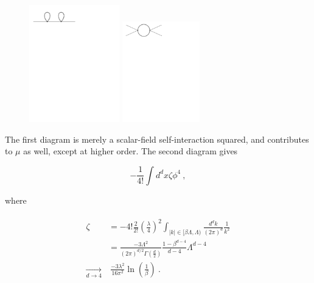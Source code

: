 \documentclass[10pt,twoside]{report}
\begin{document}
	\begin{figure}[h]
		\centering
		\includegraphics[trim={0.5cm 22cm 10cm 0cm},width=0.35\textwidth]{Figures/renorm3.pdf}
		\includegraphics[trim={0.5cm 22cm 10cm 0cm},width=0.3\textwidth]{Figures/renorm2.pdf}
		\vspace{-0.25cm}
		\label{fey:3}
	\end{figure}
	
	The first diagram is merely a scalar-field self-interaction squared, and contributes to $\mu$ as well, except at higher order. The second diagram gives
	
	\begin{equation}
		-\frac{1}{4!}\int d^dx\zeta\phi^4 \:,
	\end{equation}
	
	\noindent where
	
	\begin{align}
		\begin{split}
		\zeta &= -4! \frac{2}{2!}\left(\frac{\lambda}{4}\right)^2\int_{|k|\in[\beta\Lambda,\Lambda)}\frac{d^dk}{(2\pi)^d}\frac{1}{k^2} \\
		&= \frac{-3\Lambda^2}{(2\pi)^{d/2}\Gamma\left(\frac{d}{2}\right)}\frac{1-\beta^{d-4}}{d-4}\Lambda^{d-4}\\
		\underset{d\rightarrow4}{\longrightarrow}&\: \frac{-3\lambda^2}{16\pi^2}\ln\left(\frac{1}{\beta}\right) \:.
		\end{split}
	\end{align}
	
\end{document}
